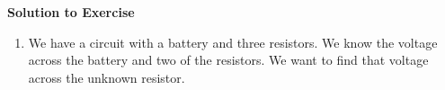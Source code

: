 {\begin{mdframed}[linewidth=4, leftmargin=40, rightmargin=40]
\begin{exercise}
 \par 
        \vspace{5pt}
        \label{m38772*solfhsst!!!underscore!!!id1022}\noindent\textbf{Solution to Exercise } \label{m38772*listfhsst!!!underscore!!!id1022}\begin{enumerate}[noitemsep, label=\textbf{Step} \textbf{\arabic*}. ] 
            \leftskip=20pt\rightskip=\leftskip\item  
        \label{m38772*id65595}We have a circuit with a battery and three resistors. We know the voltage across the battery and two of the resistors. We want to find that voltage across the unknown resistor.\par 
        \label{m38772*id65600}\nopagebreak\noindent{}
    

\end{enumerate}
\end{exercise}
\end{mdframed}}
